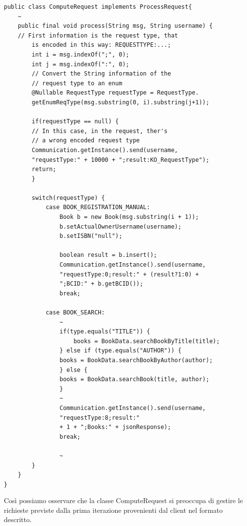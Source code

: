 \begin{lstlisting}
public class ComputeRequest implements ProcessRequest{ 
	~
	public final void process(String msg, String username) {
	// First information is the request type, that 
		is encoded in this way: REQUESTTYPE:...;
		int i = msg.indexOf(";", 0);
		int j = msg.indexOf(":", 0);
		// Convert the String information of the 
		// request type to an enum
		@Nullable RequestType requestType = RequestType.
		getEnumReqType(msg.substring(0, i).substring(j+1));

		if(requestType == null) {
		// In this case, in the request, ther's 
		// a wrong encoded request type
		Communication.getInstance().send(username,
		"requestType:" + 10000 + ";result:KO_RequestType");
		return;
		}

		switch(requestType) {
			case BOOK_REGISTRATION_MANUAL:
				Book b = new Book(msg.substring(i + 1));
				b.setActualOwnerUsername(username);
				b.setISBN("null");

				boolean result = b.insert();
				Communication.getInstance().send(username,
				"requestType:0;result:" + (result?1:0) + 
				";BCID:" + b.getBCID());
				break;
				
			case BOOK_SEARCH:
				~
				if(type.equals("TITLE")) {
					books = BookData.searchBookByTitle(title);
				} else if (type.equals("AUTHOR")) {
				books = BookData.searchBookByAuthor(author);
				} else {
				books = BookData.searchBook(title, author);
				}
				~
				Communication.getInstance().send(username, 
				"requestType:8;result:" 
				+ 1 + ";Books:" + jsonResponse);
				break;
				
				~
		}
	}
}
\end{lstlisting}
\noindent Così possiamo osservare che la classe ComputeRequest si preoccupa di gestire le richieste previste dalla prima iterazione provenienti dal client nel formato descritto.